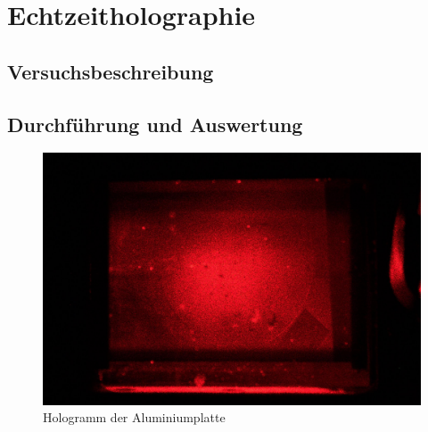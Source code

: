 \section{Echtzeitholographie}
\subsection{Versuchsbeschreibung}

\subsection{Durchführung und Auswertung}

\begin{figure}[ht]
 \includegraphics[width=\textwidth]{Photos/IMG_3927.jpg}
 \caption{Hologramm der Aluminiumplatte}
\end{figure}

